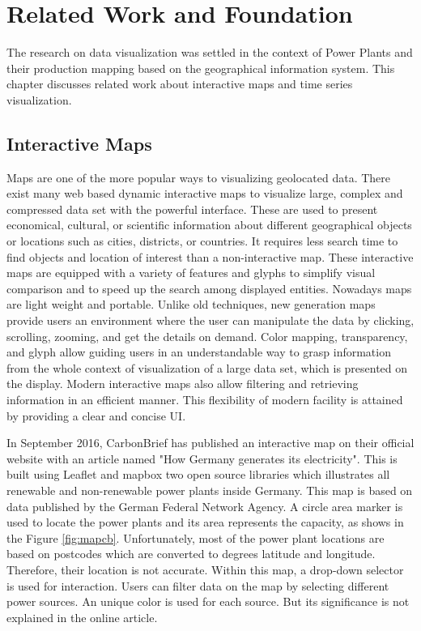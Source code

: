 \chapter{Related Work and Foundation}
\label{chap:relatedWork&Foundation}

The research on data visualization was settled in the context of Power Plants and their production mapping based on the geographical information system.  This chapter discusses related work about interactive maps and time series visualization. 

\section{Interactive Maps}

Maps are one of the more popular ways to visualizing geolocated data. There exist many web based dynamic interactive maps to visualize large, complex and compressed data set with the powerful interface. These are used to present economical, cultural, or scientific information about different geographical objects or locations such as cities, districts, or countries. It requires less search time to find objects and location of interest than a non-interactive map. These interactive maps are equipped with a variety of features and glyphs to simplify visual comparison and to speed up the search among displayed entities. Nowadays maps are light weight and portable. Unlike old techniques, new generation maps provide users an environment where the user can manipulate the data by clicking, scrolling, zooming, and get the details on demand. Color mapping, transparency, and glyph allow guiding users in an understandable way to grasp information from the whole context of visualization of a large data set, which is presented on the display. Modern interactive maps also allow filtering and retrieving information in an efficient manner. This flexibility of modern facility is attained by providing a clear and concise UI.

In September 2016, CarbonBrief \cite{cbg2016} has published an interactive map on their official website with an article named "How Germany generates its electricity". This is built using Leaflet and mapbox two open source libraries which illustrates all renewable and non-renewable power plants inside Germany. This map is based on data published by the German Federal Network Agency. A circle area marker is used to locate the power plants and its area represents the capacity, as shows in the Figure \ref{fig:mapcb}. Unfortunately, most of the power plant locations are based on postcodes which are converted to degrees latitude and longitude. Therefore, their location is not accurate. Within this map, a drop-down selector is used for interaction. Users can filter data on the map by selecting different power sources. An unique color is used for each source. But its significance is not explained in the online article.

